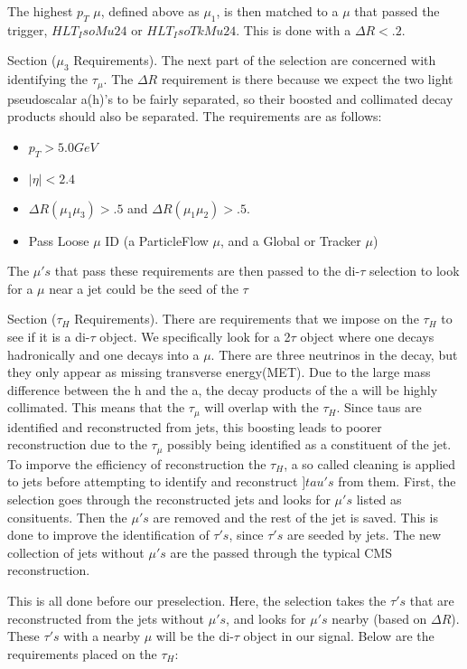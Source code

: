The highest $p_{T}$ $\mu$, defined above as $\mu_{1}$, is then matched to a $\mu$ that passed the trigger, $HLT_IsoMu24$ or $HLT_IsoTkMu24$. This is done with a $\Delta R < .2$.


Section ($\mu_{3}$ Requirements). The next part of the selection are concerned with identifying the $\tau_{\mu}$. The $\Delta R$ requirement is there because we expect the two light pseudoscalar a(h)'s to be fairly separated, so their boosted and collimated decay products should also be separated. The requirements are as follows:

\begin{itemize}  
  \item $p_{T} > 5.0 GeV$
  \item $|\eta| < 2.4$
  \item $\Delta R(\mu_{1}\mu_{3}) > .5$ and $\Delta R(\mu_{1}\mu_{2}) > .5$. 
  \item Pass Loose $\mu$ ID (a ParticleFlow $\mu$, and a Global or Tracker $\mu$)
\end{itemize}

The $\mu's$ that pass these requirements are then passed to the di-$\tau$ selection to look for a $\mu$ near a jet could be the seed of the $\tau$

 
Section ($\tau_{H}$ Requirements). There are requirements that we impose on the $\tau_{H}$ to see if it is a di-$\tau$ object. We specifically look for a 2$\tau$ object where one decays hadronically and one decays into a $\mu$. There are three neutrinos in the decay, but they only appear as missing transverse energy(MET). Due to the large mass difference between the h and the a, the decay products of the a will be highly collimated. This means that the $\tau_{\mu}$ will overlap with the $\tau_{H}$. Since taus are identified and reconstructed from jets, this boosting leads to poorer reconstruction due to the $\tau_{\mu}$ possibly being identified as a constituent of the jet. To imporve the efficiency of reconstruction the $\tau_{H}$, a so called cleaning is applied to jets before attempting to identify and reconstruct $]tau's$ from them.  First, the selection goes through the reconstructed jets and looks for $\mu's$ listed as consituents. Then the $\mu's$ are removed and the rest of the jet is saved. This is done to improve the identification of $\tau's$, since $\tau's$ are seeded by jets. The new collection of jets without $\mu's$ are the passed through the typical CMS reconstruction. 

This is all done before our preselection. Here, the selection takes the $\tau's$ that are reconstructed from the jets without $\mu's$, and looks for $\mu's$ nearby (based on $\Delta R$). These $\tau's$ with a nearby $\mu$ will be the di-$\tau$ object in our signal. Below are the requirements placed on the $\tau_{H}$:


